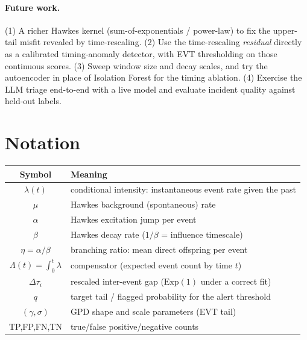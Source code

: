 \documentclass[11pt,a4paper]{article}
\begin{document}
\paragraph{Future work.} (1) A richer Hawkes kernel (sum-of-exponentials /
power-law) to fix the upper-tail misfit revealed by time-rescaling. (2) Use the
time-rescaling \emph{residual} directly as a calibrated timing-anomaly detector,
with EVT thresholding on those continuous scores. (3) Sweep window size and decay
scales, and try the autoencoder in place of Isolation Forest for the timing
ablation. (4) Exercise the LLM triage end-to-end with a live model and evaluate
incident quality against held-out labels.

\appendix
\section{Notation}
\begin{table}[H]\centering\small
\renewcommand{\arraystretch}{1.15}
\begin{tabular}{@{}c l@{}}
\toprule
Symbol & Meaning \\
\midrule
$\lambda(t)$ & conditional intensity: instantaneous event rate given the past \\
$\mu$ & Hawkes background (spontaneous) rate \\
$\alpha$ & Hawkes excitation jump per event \\
$\beta$ & Hawkes decay rate ($1/\beta$ = influence timescale) \\
$\eta=\alpha/\beta$ & branching ratio: mean direct offspring per event \\
$\Lambda(t)=\int_0^t\lambda$ & compensator (expected event count by time $t$) \\
$\Delta\tau_i$ & rescaled inter-event gap ($\mathrm{Exp}(1)$ under a correct fit) \\
$q$ & target tail / flagged probability for the alert threshold \\
$(\gamma,\sigma)$ & GPD shape and scale parameters (EVT tail) \\
TP,FP,FN,TN & true/false positive/negative counts \\
\bottomrule
\end{tabular}
\end{table}
\end{document}

